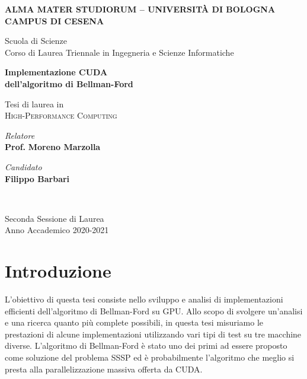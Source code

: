 \documentclass[12pt,a4paper,oneside]{book}
\begin{document}
	
	\begin{titlepage}
		\begin{center}
			\large
			\textbf{ALMA MATER STUDIORUM -- UNIVERSITÀ DI BOLOGNA \\ CAMPUS DI CESENA} \\
			\noindent\hrulefill
			\vspace{0.4cm}
			
			\Large
			Scuola di Scienze \\
			Corso di Laurea Triennale in Ingegneria e Scienze Informatiche
			
			\Huge
			\vspace{4cm}
			\textbf{
				Implementazione CUDA \\
				dell'algoritmo di Bellman-Ford
			}
			
			\large
			\vspace{1cm}
			Tesi di laurea in \\
			\textsc{High-Performance Computing}
			
			\vspace{5.5cm}
			\begin{minipage}[t]{0.64\textwidth}
				\begin{flushleft}
					\textit{Relatore} \\ 
					\textbf{Prof.} \textbf{Moreno Marzolla}
				\end{flushleft}
			\end{minipage}
			\begin{minipage}[t]{0.34\textwidth}
				\begin{flushright}
					\textit{Candidato} \\ 
					\textbf{Filippo Barbari}
				\end{flushright}
			\end{minipage}\\
			\vfill
			\noindent\hrulefill
			\vspace{0.3cm}
			
			\Large
			Seconda Sessione di Laurea \\
			Anno Accademico 2020-2021
		\end{center}
	\end{titlepage}
	\restoregeometry

	\tableofcontents
	\listoffigures
	\listoftables
	\listofalgorithms
	
	\chapter*{Introduzione}
	L'obiettivo di questa tesi consiste nello sviluppo e analisi di implementazioni efficienti dell'algoritmo di Bellman-Ford su GPU. Allo scopo di svolgere un'analisi e una ricerca quanto più complete possibili, in questa tesi misuriamo le prestazioni di alcune implementazioni utilizzando vari tipi di test su tre macchine diverse. L'algoritmo di Bellman-Ford è stato uno dei primi ad essere proposto come soluzione del problema SSSP ed è probabilmente l'algoritmo che meglio si presta alla parallelizzazione massiva offerta da CUDA.
	
\end{document}
